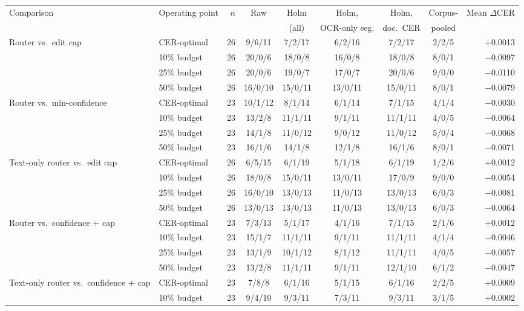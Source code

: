 \begin{tabular}{llrcccccr}
\toprule
Comparison & Operating point & $n$ & Raw & Holm & Holm, & Holm, & Corpus- & Mean $\Delta$CER \\
 & & & & (all) & OCR-only seg. & doc.\ CER & pooled & \\
\midrule
Router vs.\ edit cap & CER-optimal & 26 & 9/6/11 & 7/2/17 & 6/2/16 & 7/2/17 & 2/2/5 & $+$0.0013 \\
 & 10\% budget & 26 & 20/0/6 & 18/0/8 & 16/0/8 & 18/0/8 & 8/0/1 & $-$0.0097 \\
 & 25\% budget & 26 & 20/0/6 & 19/0/7 & 17/0/7 & 20/0/6 & 9/0/0 & $-$0.0110 \\
 & 50\% budget & 26 & 16/0/10 & 15/0/11 & 13/0/11 & 15/0/11 & 8/0/1 & $-$0.0079 \\
\addlinespace[2pt]
Router vs.\ min-confidence & CER-optimal & 23 & 10/1/12 & 8/1/14 & 6/1/14 & 7/1/15 & 4/1/4 & $-$0.0030 \\
 & 10\% budget & 23 & 13/2/8 & 11/1/11 & 9/1/11 & 11/1/11 & 4/0/5 & $-$0.0064 \\
 & 25\% budget & 23 & 14/1/8 & 11/0/12 & 9/0/12 & 11/0/12 & 5/0/4 & $-$0.0068 \\
 & 50\% budget & 23 & 16/1/6 & 14/1/8 & 12/1/8 & 16/1/6 & 8/0/1 & $-$0.0071 \\
\addlinespace[2pt]
Text-only router vs.\ edit cap & CER-optimal & 26 & 6/5/15 & 6/1/19 & 5/1/18 & 6/1/19 & 1/2/6 & $+$0.0012 \\
 & 10\% budget & 26 & 18/0/8 & 15/0/11 & 13/0/11 & 17/0/9 & 9/0/0 & $-$0.0054 \\
 & 25\% budget & 26 & 16/0/10 & 13/0/13 & 11/0/13 & 13/0/13 & 6/0/3 & $-$0.0081 \\
 & 50\% budget & 26 & 13/0/13 & 13/0/13 & 11/0/13 & 13/0/13 & 6/0/3 & $-$0.0064 \\
\addlinespace[2pt]
Router vs.\ confidence + cap & CER-optimal & 23 & 7/3/13 & 5/1/17 & 4/1/16 & 7/1/15 & 2/1/6 & $+$0.0012 \\
 & 10\% budget & 23 & 15/1/7 & 11/1/11 & 9/1/11 & 11/1/11 & 4/1/4 & $-$0.0046 \\
 & 25\% budget & 23 & 13/1/9 & 10/1/12 & 8/1/12 & 11/1/11 & 4/0/5 & $-$0.0057 \\
 & 50\% budget & 23 & 13/2/8 & 11/1/11 & 9/1/11 & 12/1/10 & 6/1/2 & $-$0.0047 \\
\addlinespace[2pt]
Text-only router vs.\ confidence + cap & CER-optimal & 23 & 7/8/8 & 6/1/16 & 5/1/15 & 6/1/16 & 2/2/5 & $+$0.0009 \\
 & 10\% budget & 23 & 9/4/10 & 9/3/11 & 7/3/11 & 9/3/11 & 3/1/5 & $+$0.0002 \\

\end{tabular}

